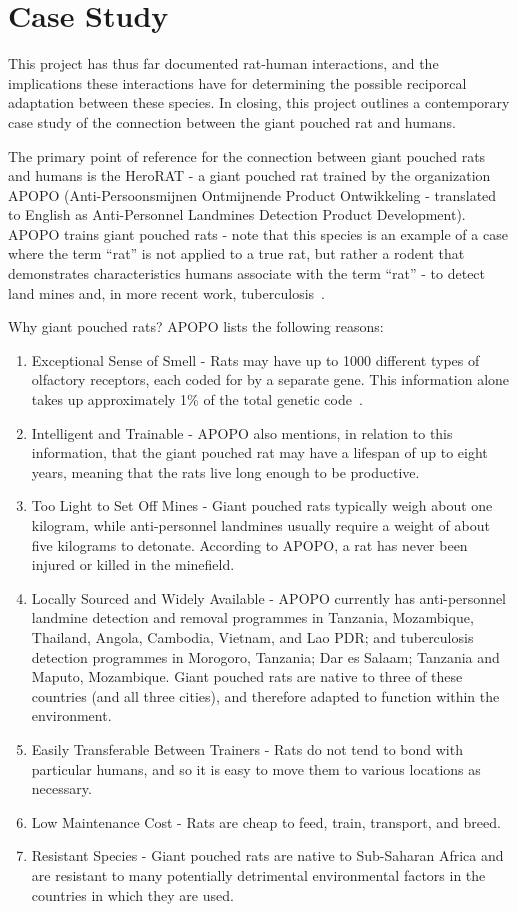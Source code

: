\documentclass[12pt]{article}
\begin{document}
\section{Case Study} \label{Service}

This project has thus far documented rat-human interactions, and the implications these interactions have for determining the possible reciporcal adaptation between these species. In closing, this project outlines a contemporary case study of the connection between the giant pouched rat and humans.

The primary point of reference for the connection between giant pouched rats and humans is the HeroRAT - a giant pouched rat trained by the organization APOPO (Anti-Persoonsmijnen Ontmijnende Product Ontwikkeling - translated to English as Anti-Personnel Landmines Detection Product Development). APOPO trains giant pouched rats - note that this species is an example of a case where the term ``rat'' is not applied to a true rat, but rather a rodent that demonstrates characteristics humans associate with the term ``rat'' - to detect land mines and, in more recent work, tuberculosis~\cite{APOPO}.

Why giant pouched rats? APOPO lists the following reasons:
\begin{enumerate}
\item Exceptional Sense of Smell - Rats may have up to 1000 different types of olfactory receptors, each coded for by a separate gene. This information alone takes up approximately 1\% of the total genetic code~\cite{Hanson2012}.
\item Intelligent and Trainable - APOPO also mentions, in relation to this information, that the giant pouched rat may have a lifespan of up to eight years, meaning that the rats live long enough to be productive.
\item Too Light to Set Off Mines - Giant pouched rats typically weigh about one kilogram, while anti-personnel landmines usually require a weight of about five kilograms to detonate. According to APOPO, a rat has never been injured or killed in the minefield.
\item Locally Sourced and Widely Available - APOPO currently has anti-personnel landmine detection and removal programmes in Tanzania, Mozambique, Thailand, Angola, Cambodia, Vietnam, and Lao PDR; and tuberculosis detection programmes in Morogoro, Tanzania; Dar es Salaam; Tanzania and Maputo, Mozambique. Giant pouched rats are native to three of these countries (and all three cities), and therefore adapted to function within the environment.
\item Easily Transferable Between Trainers - Rats do not tend to bond with particular humans, and so it is easy to move them to various locations as necessary.
\item Low Maintenance Cost - Rats are cheap to feed, train, transport, and breed.
\item Resistant Species - Giant pouched rats are native to Sub-Saharan Africa and are resistant to many potentially detrimental environmental factors in the countries in which they are used.
\end{enumerate}
\end{document}
